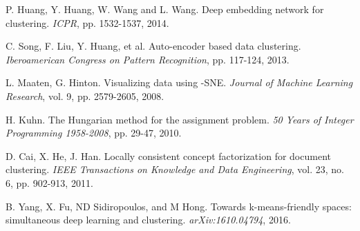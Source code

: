 \documentclass[preprint,12pt]{elsarticle}
\begin{document}
\begin{thebibliography}{99}
P. Huang, Y. Huang, W. Wang and L. Wang. Deep embedding network for clustering.
\textit{ICPR}, pp. 1532-1537, 2014.

C. Song, F. Liu, Y. Huang, et al. Auto-encoder based data clustering.
\textit{Iberoamerican Congress on Pattern Recognition}, pp. 117-124, 2013.

L. Maaten, G. Hinton. Visualizing data using -SNE.
\textit{Journal of Machine Learning Research}, vol. 9, pp. 2579-2605, 2008.

H. Kuhn. The Hungarian method for the assignment problem.
\textit{50 Years of Integer Programming 1958-2008}, pp. 29-47, 2010.

D. Cai, X. He, J. Han. Locally consistent concept factorization for document clustering.
\textit{IEEE Transactions on Knowledge and Data Engineering}, vol. 23, no. 6, pp. 902-913, 2011.

B. Yang, X. Fu, ND Sidiropoulos, and M Hong. Towards k-means-friendly spaces: simultaneous deep learning and clustering.
\textit{arXiv:1610.04794}, 2016.











\end{thebibliography}
\end{document}
